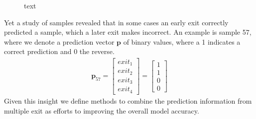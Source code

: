 \begin{figure}
	\captionsetup[subfigure]{justification=centering}
	\centering
	\hfill
	\caption[short text]{text}
	\label{fig:exit-highscore}
\end{figure}

Yet a study of samples revealed that in some cases an early exit correctly predicted a sample, which a later exit makes incorrect. An example is sample 57, where we denote a prediction vector $\mathbf{p}$ of binary values, where a 1 indicates a correct prediction and 0 the reverse. 
\begin{align*}
\mathbf{p}_{57}=
\begin{bmatrix}
exit_1 \\
exit_2 \\
exit_3 \\
exit_4
\end{bmatrix}
=
\begin{bmatrix}
1 \\
1 \\
0 \\
0
\end{bmatrix}
\end{align*}
Given this insight we define methods to combine the prediction information from multiple exit as efforts to improving the overall model accuracy. 

